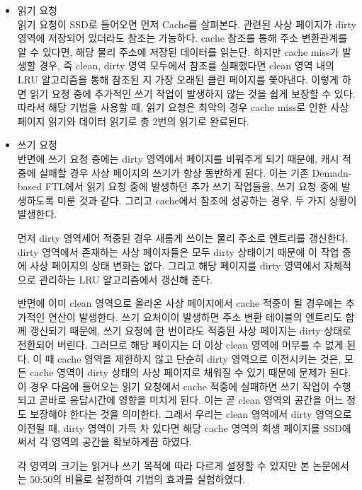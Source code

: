 \documentclass[conference]{IEEEtran}
\begin{document}
\begin{itemize}
	\item{읽기 요청}\\
	읽기 요청이 SSD로 들어오면 먼저 Cache를 살펴본다. 관련된 사상 페이지가 dirty 영역에 저장되어 있더라도 참조는 가능하다. cache 참조를 통해 주소 변환관계를 알 수 있다면, 해당 물리 주소에 저장된 데이터를 읽는단. 하지만 cache miss가 발생할 경우, 즉 clean, dirty 영역 모두에서 참조를 실패했다면 clean 영역 내의 LRU 알고리즘을 통해 참조된 지 가장 오래된 클린 페이지를 쫓아낸다. 이렇게 하면 읽기 요청 중에 추가적인 쓰기 작업이 발생하지 않는 것을 쉽게 보장할 수 있다. 따라서 해당 기법을 사용할 때, 읽기 요청은 최악의 경우 cache miss로 인한 사상 페이지 읽기와 데이터 읽기로 총 2번의 읽기로 완료된다.
	\item{쓰기 요청}\\
	반면에 쓰기 요청 중에는 dirty 영역에서 페이지를 비워주게 되기 때문에, 캐시 적중에 실패할 경우 사상 페이지의 쓰기가 항상 동반하게 된다. 이는 기존 Demadn-based FTL에서 읽기 요청 중에 발생하던 추가 쓰기 작업들을, 쓰기 요청 중에 발생하도록 미룬 것과 같다. 그리고 cache에서 참조에 성공하는 경우, 두 가지 상황이 발생한다.\par
	먼저 dirty 영역세어 적중된 경우 새롬게 쓰이는 물리 주소로 엔트리를 갱신한다. dirty 영역에서 존재하는 사상 페이자들은 모두 dirty 상태이기 때문에 이 작업 중에 사상 페이지의 상태 변화는 없다. 그리고 해당 페이지를 dirty 영역에서 자체적으로 관리하는 LRU 알고리즘에서 갱신해 준다.\par
	반면에 이미 clean 영역으로 올라온 사상 페이지에서 cache 적중이 될 경우에는 추가적인 연산이 발생한다. 쓰기 요처이이 발생하면 주소 변환 테이블의 엔트리도 함께 갱신되기 때문에, 쓰기 요청에 한 번이라도 적중된 사상 페이지는 dirty 상태로 전환되어 버린다. 그러므로 해당 페이지는 더 이상 clean 영역에 머무를 수 없게 된다. 이 때 cache 영역을 제한하지 않고 단순히 dirty 영역으로 이전시키는 것은, 모든 cache 영역이 dirty 상태의 사상 페이지로 채워질 수 있기 때문에 문제가 된다. 이 경우 다음에 들어오는 읽기 요청에서 cache 적중에 실패하면 쓰기 작업이 수행되고 곧바로 응답시간에 영향을 미치게 된다. 이는 곧 clean 영역의 공간을 어느 정도 보장해야 한다는 것을 의미한다. 그래서 우리는 clean 영역에서 dirty 영역으로 이전될 때, dirty 영역이 가득 차 있다면 해당 cache 영역의 희생 페이지를 SSD에 써서 각 영역의 공간을 확보하게끔 하였다.\par
	각 영역의 크기는 읽거나 쓰기 목적에 따라 다르게 설정할 수 있지만 본 논문에서는 50:50의 비율로 설정하여 기법의 효과를 실험하였다.
\end{itemize}
\end{document}
